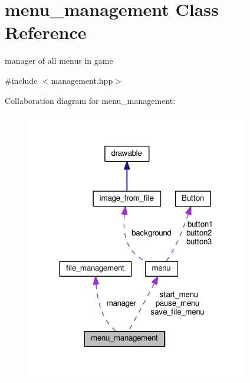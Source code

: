 \hypertarget{classmenu__management}{}\section{menu\+\_\+management Class Reference}
\label{classmenu__management}


manager of all menu\textquotesingle{}s in game  




{\ttfamily \#include $<$management.\+hpp$>$}



Collaboration diagram for menu\+\_\+management\+:\nopagebreak
\begin{figure}[H]
\begin{center}
\leavevmode
\includegraphics[width=276pt]{classmenu__management__coll__graph}
\end{center}
\end{figure}
